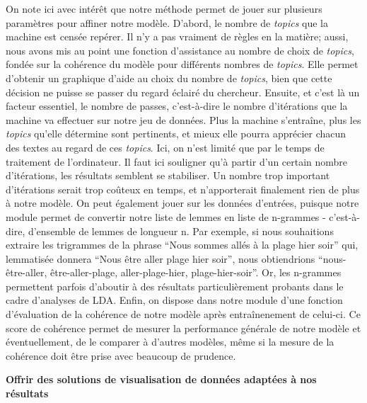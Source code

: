 \documentclass[letterpaper,portrait,12pt]{article}
\begin{document}
On note ici avec int\'{e}r\^{e}t que notre m\'{e}thode permet de jouer sur plusieurs param\`{e}tres pour affiner notre mod\`{e}le. D'abord, le nombre de \emph{topics} que la machine est cens\'{e}e rep\'{e}rer. Il n'y a pas vraiment de r\`{e}gles en la mati\`{e}re; aussi, nous avons mis au point une fonction d'assistance au nombre de choix de \emph{topics}, fond\'{e}e sur la coh\'{e}rence du mod\`{e}le pour diff\'{e}rents nombres de \emph{topics}. Elle permet d'obtenir un graphique d'aide au choix du nombre de \emph{topics}, bien que cette d\'{e}cision ne puisse se passer du regard \'{e}clair\'{e} du chercheur. Ensuite, et c'est l\`{a} un facteur essentiel, le nombre de passes, c'est-\`{a}-dire le nombre d'it\'{e}rations que la machine va effectuer sur notre jeu de donn\'{e}es. Plus la machine s'entra\^{i}ne, plus les \emph{topics} qu'elle d\'{e}termine sont pertinents, et mieux elle pourra appr\'{e}cier chacun des textes au regard de ces \emph{topics}. Ici, on n'est limit\'{e} que par le temps de traitement de l'ordinateur. Il faut ici souligner qu'\`{a} partir d'un certain nombre d'it\'{e}rations, les r\'{e}sultats semblent se stabiliser. Un nombre trop important d'it\'{e}rations serait trop co\^{u}teux en temps, et n'apporterait finalement rien de plus \`{a} notre mod\`{e}le. On peut \'{e}galement jouer sur les donn\'{e}es d'entr\'{e}es, puisque notre module permet de convertir notre liste de lemmes en liste de n-grammes - c'est-\`{a}-dire, d'ensemble de lemmes de longueur n. Par exemple, si nous souhaitions extraire les trigrammes de la phrase {``}Nous sommes all\'{e}s \`{a} la plage hier soir'' qui, lemmatis\'{e}e donnera {``}Nous \^{e}tre aller plage hier soir'', nous obtiendrions {``}nous-\^{e}tre-aller, \^{e}tre-aller-plage, aller-plage-hier, plage-hier-soir''. Or, les n-grammes permettent parfois d'aboutir \`{a} des r\'{e}sultats particuli\`{e}rement probants dans le cadre d'analyses de LDA. Enfin, on dispose dans notre module d'une fonction d'\'{e}valuation de la coh\'{e}rence de notre mod\`{e}le apr\`{e}s entra\^{i}nenement de celui-ci. Ce score de coh\'{e}rence permet de mesurer la performance g\'{e}n\'{e}rale de notre mod\`{e}le et \'{e}ventuellement, de le comparer \`{a} d'autres mod\`{e}les, m\^{e}me si la mesure de la coh\'{e}rence doit \^{e}tre prise avec beaucoup de prudence.








\textbf{	Offrir des solutions de visualisation de donn\'{e}es adapt\'{e}es \`{a} nos r\'{e}sultats}
\end{document}

